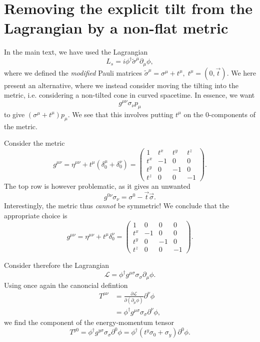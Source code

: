 \section{Removing the explicit tilt from the Lagrangian by a non-flat metric}\label{sec:tilt-metric}
In the main text, we have used the Lagrangian
\begin{equation}
  L_s = i \phi^{\dagger} \tilde{\sigma} ^{\mu} \partial_{\mu} \phi,
\end{equation}
where we defined the \emph{modified} Pauli matrices \( \tilde{\sigma} ^{\mu}= \sigma^{\mu} + t^{\mu}, \; t^{\mu} = (0, \vec{t}) \).
We here present an alternative, where we instead consider moving the tilting into the metric, i.e. considering a non-tilted cone in curved spacetime.
In essence, we want
\[
g^{\mu \nu} \sigma_{\nu} p_{\mu}
\]
to give \( (\sigma^{\mu} + t^{\mu}) p_{\mu} \).
We see that this involves putting \( t^{\mu} \) on the 0-components of the metric.

Consider the metric
\begin{equation}
  g^{\mu \nu} = \eta^{\mu \nu } + t^{\mu} (\delta^{\mu}_0 + \delta^{\nu}_0) =
  \begin{pmatrix}
    1 & t^x & t^y & t^z\\
    t^x & -1 & 0 &0\\
    t^y & 0 & -1 &0\\
    t^z & 0 & 0 &-1
  \end{pmatrix}.
\end{equation}
The top row is however problematic, as it gives an unwanted
\[
g^{0 \nu} \sigma_{\nu} = \sigma^0 - \vec{t} \vec{\sigma}.
\]
Interestingly, the metric thus \emph{cannot} be symmetric!
We conclude that the appropriate choice is
\begin{equation}
  g^{\mu \nu} = \eta^{\mu \nu } + t^{\mu} \delta^{\nu}_0 =
  \begin{pmatrix}
    1 & 0 & 0 & 0\\
    t^x & -1 & 0 &0\\
    t^y & 0 & -1 &0\\
    t^z & 0 & 0 &-1
  \end{pmatrix}.
\end{equation}

Consider therefore the Lagrangian
\begin{equation}
  \mathcal{L} = \phi^{\dagger} g^{\mu \sigma} \sigma_{\sigma} \partial_{\mu} \phi.
\end{equation}
Using once again the canoncial defintion
\begin{align}
  T^{\mu \nu} &= \frac{\partial \mathcal{L}}{\partial(\partial_{\mu}\phi)} \partial^{\nu} \phi\\
  &= \phi^{\dagger} g^{\mu \sigma} \sigma_{\sigma} \partial^{\nu} \phi,
\end{align}
we find the component of the energy-momentum tensor
\begin{equation}
  T^{y 0} = \phi^{\dagger} g^{y \sigma} \sigma_{\sigma} \partial^0 \phi =
  \phi^{\dagger} (t^y \sigma_0 + \sigma_y) \partial^0 \phi.
\end{equation}

